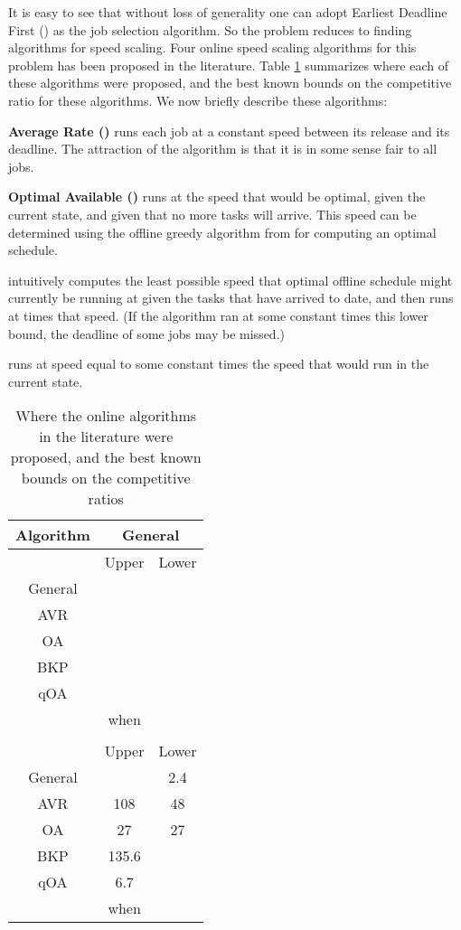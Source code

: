 \documentclass[11pt]{article}
\newcommand{\BKP}{{\rm BKP}}
\newcommand{\AVR}{{\rm AVR}}
\newcommand{\OA}{{\rm OA}}
\newcommand{\qOA}{{\rm qOA}}
\begin{document}
It is easy to see that without loss of generality one can adopt Earliest Deadline First ()
as the job selection algorithm. So the problem reduces to finding algorithms for speed scaling.
Four online speed scaling algorithms for this problem has been proposed in the literature.
Table \ref{table:CR} summarizes where each of these algorithms were proposed, and the
best known bounds on the competitive ratio for these algorithms. We now briefly describe
these algorithms:

\smallskip
\noindent
{\bf Average Rate (\boldmath\unboldmath)}
runs each job at a constant speed between its release and its deadline.
The attraction of the algorithm  is that it is in some sense fair
to all jobs.

\smallskip
\noindent
{\bf Optimal Available (\boldmath\unboldmath)}
runs at the speed that would be optimal, given the current state, and given that no more tasks will arrive.
This speed can be determined using the offline greedy 
algorithm  from \cite{YDS} for computing an optimal schedule.

\smallskip
\noindent
{\bf \boldmath\unboldmath} 
intuitively computes the least possible speed
that optimal offline schedule  might currently be running at given the
tasks that have arrived to date, and 
then runs at  times that speed. (If the algorithm ran at some constant  times this lower bound,
the deadline of some jobs may be missed.)

\smallskip
\noindent
{\bf \boldmath\unboldmath}
runs at
speed equal to some constant  times the speed that 
would run in the current state.

\smallskip

\begin{table}[h]
\centering
\begin{tabular}{|c||c|c|}
\hline
Algorithm&\multicolumn{2}{|c|}{General } \\
\hline
&Upper&Lower\\
\hline
General&&\\
\hline
\AVR\cite{YDS}&\cite{YDS,BBCP}&\cite{BBCP}\\
\hline
\OA\cite{YDS}&\cite{BKP}&\cite{YDS}\\
\hline
\BKP\cite{BKP}&\cite{BKP}&\\
\hline
\qOA\cite{qOA}&\cite{qOA}&\cite{qOA}\\
&when & \\
\hline
\hline
&\multicolumn{2}{|c|}{} \\
\hline
&Upper&Lower\\
\hline
General&&2.4\\
\hline
\AVR&108&48\\
\hline
\OA&27&27\\
\hline
\BKP&135.6&\\
\hline
\qOA&6.7&\\
&when &\\
\hline
\end{tabular}
\caption{Where the online algorithms in the literature were proposed, and the best known bounds on the competitive ratios}
\label{table:CR}
\end{table}
\end{document}
